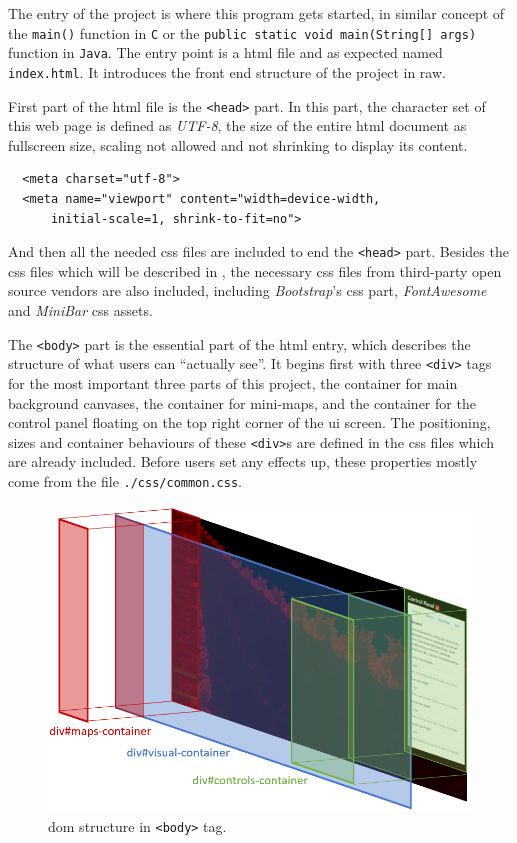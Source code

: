 The entry of the project is where this program gets started, in similar concept of the \texttt{main()} function in \texttt{C} or the \texttt{public static void main(String[] args)} function in \texttt{Java}. The entry point is a \gls{html} file and as expected named \texttt{index.html}. It introduces the front end structure of the project in raw.

First part of the \gls{html} file is the \texttt{<head>} part. In this part, the character set of this web page is defined as \emph{UTF-8}, the size of the entire \gls{html} document as fullscreen size, scaling not allowed and not shrinking to display its content.

\begin{verbatim}
  <meta charset="utf-8">
  <meta name="viewport" content="width=device-width,
      initial-scale=1, shrink-to-fit=no">
\end{verbatim}

And then all the needed \gls{css} files are included to end the \texttt{<head>} part. Besides the \gls{css} files which will be described in , the necessary \gls{css} files from third-party open source vendors are also included, including \emph{Bootstrap}'s \gls{css} part, \emph{FontAwesome} and \emph{MiniBar} \gls{css} assets.

The \texttt{<body>} part is the essential part of the \gls{html} entry, which describes the structure of what users can ``actually see''. It begins first with three \texttt{<div>} tags for the most important three parts of this project, the container for main background canvases, the container for mini-maps, and the container for the control panel floating on the top right corner of the \gls{ui} screen. The positioning, sizes and container behaviours of these \texttt{<div>}s are defined in the \gls{css} files which are already included. Before users set any effects up, these properties mostly come from the file \texttt{./css/common.css}.

\begin{figure}[th]
\centering
\includegraphics[width=\textwidth,keepaspectratio]{Figures/Chapter4/rootdom.png}
\decoRule
\caption[DOM Body Structure]{\gls{dom} structure in \texttt{<body>} tag.}
\label{fig:rootdom}
\end{figure}

